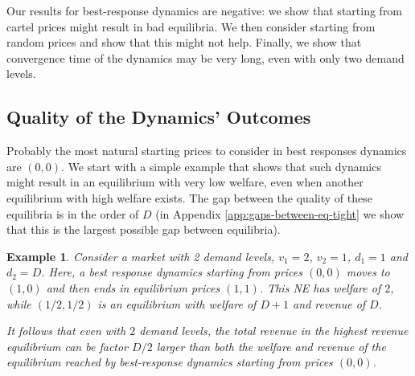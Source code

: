 \documentclass[11pt,a4paper]{article}
\newtheorem{example}[theorem]{Example}
\begin{document}
Our results for best-response dynamics are negative: we show that starting from cartel prices might result in  bad equilibria. We then consider starting from random prices and show that this might not help.  Finally, we show that convergence time of the dynamics may be very long, even with only two demand levels.



\subsection{Quality of the Dynamics' Outcomes}

Probably the most natural starting prices to consider in best responses dynamics are $(0,0)$. We start with a simple example that shows that such dynamics might result in an equilibrium with very low welfare, even when another equilibrium with high welfare exists.
The gap between the quality of these equilibria is in the order of $D$ (in Appendix \ref{app:gaps-between-eq-tight} we show that this is the largest possible gap between equilibria).

\begin{example}
\label{obs:equal-split-2}
Consider a market with 2 demand levels, $v_1=2$, $v_2=1$, $d_1=1$ and $d_2=D$.
Here, a best response dynamics starting from prices $(0,0)$ moves to $(1,0)$ and then ends in equilibrium prices $(1,1)$. This NE has welfare of $2$,
while $(1/2,1/2)$ is an equilibrium with welfare of $D+1$ and revenue of $D$.

It follows that even with $2$ demand levels, the total revenue in the highest revenue equilibrium can be factor $D/2$ larger than both the welfare and revenue of the equilibrium reached by best-response dynamics starting from prices $(0,0)$.

\end{example}
\end{document}
